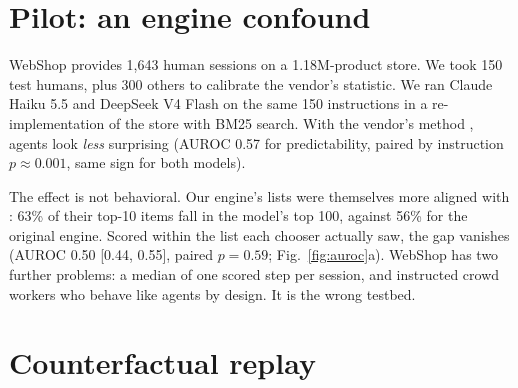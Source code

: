 \section{Pilot: an engine confound}
\label{sec:pilot}
WebShop \cite{yao2022webshop} provides 1{,}643 human sessions on a 1.18M-product store. We took 150 test humans, plus 300 others to calibrate the vendor's statistic. We ran Claude Haiku 5.5 and DeepSeek V4 Flash on the same 150 instructions in a re-implementation of the store with BM25 search. With the vendor's method \cite{unbox2026anomaly}, agents look \emph{less} surprising (AUROC 0.57 for predictability, paired by instruction $p\approx0.001$, same sign for both models).

The effect is not behavioral. Our engine's lists were themselves more aligned with \bgpt{}: 63\% of their top-10 items fall in the model's top 100, against 56\% for the original engine. Scored within the list each chooser actually saw, the gap vanishes (AUROC 0.50 [0.44, 0.55], paired $p=0.59$; Fig.~\ref{fig:auroc}a). WebShop has two further problems: a median of one scored step per session, and instructed crowd workers who behave like agents by design. It is the wrong testbed.

\section{Counterfactual replay}
\label{sec:replay}

